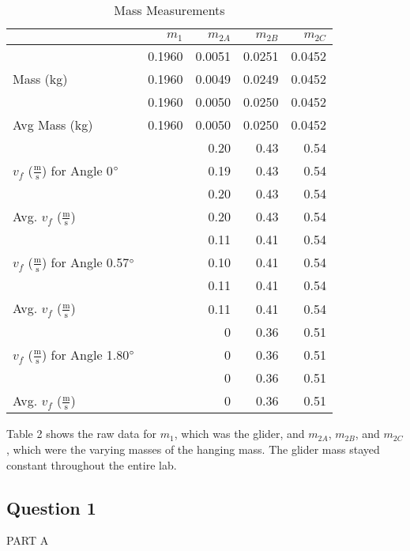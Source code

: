 \documentclass [12pt, letterpaper, twoside] {article}
\begin{document}
  \begin {table}[h]
   \centering
    \begin {tabular} {| l | r | r | r | r |}
      \hline\hline
      & \(m_{1}\) & \(m_{2A}\) & \(m_{2B}\) & \(m_{2C}\) \\
      \hline
      \multirow {3}{*}{Mass (kg)} & 0.1960 & 0.0051 & 0.0251 & 0.0452 \\ 
      & 0.1960 & 0.0049 & 0.0249 & 0.0452 \\
      & 0.1960 & 0.0050 & 0.0250 & 0.0452 \\
      \hline
      Avg Mass (kg) & 0.1960 & 0.0050 & 0.0250 & 0.0452 \\
      \hline
      \multirow {3}{*}{\(v_{f}\) (\(\tfrac{\text{m}}{\text{s}}\)) for Angle 0\(\degree\)} & & 0.20 & 0.43 & 0.54 \\
      & & 0.19 & 0.43 & 0.54 \\
      & & 0.20 & 0.43 & 0.54 \\
      \hline
      Avg. \(v_{f}\) (\(\tfrac{\text{m}}{\text{s}}\)) & & 0.20 & 0.43 & 0.54 \\ %
      \hline
      \multirow {3}{*}{\(v_{f}\) (\(\tfrac{\text{m}}{\text{s}}\)) for Angle 0.57\(\degree\)} & & 0.11 & 0.41 & 0.54 \\
      & & 0.10 & 0.41 & 0.54 \\
      & & 0.11 & 0.41 & 0.54 \\
      \hline
      Avg. \(v_{f}\) (\(\tfrac{\text{m}}{\text{s}}\)) & & 0.11 & 0.41 & 0.54 \\ %
      \hline
      \multirow {3}{*}{\(v_{f}\) (\(\tfrac{\text{m}}{\text{s}}\)) for Angle 1.80\(\degree\)} & & 0 & 0.36 & 0.51 \\
      & & 0 & 0.36 & 0.51 \\
      & & 0 & 0.36 & 0.51 \\
      \hline
      Avg. \(v_{f}\) (\(\tfrac{\text{m}}{\text{s}}\)) & & 0 & 0.36 & 0.51 \\
      \hline\hline
    \end {tabular}
    \caption {Mass Measurements}
  \end {table}

\noindent
Table 2 shows the raw data for \(m_{1}\), which was the glider, and \(m_{2A}\), \(m_{2B}\), and \(m_{2C}\), which were the varying masses of the hanging mass. The glider mass stayed constant throughout the entire lab.

\subsection* {Question 1}
PART A \\\\
\end{document}
